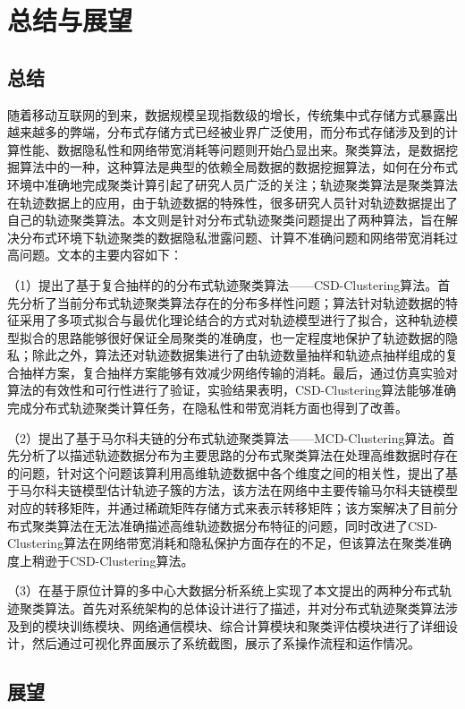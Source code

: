 \chapter{总结与展望}

\section{总结}

随着移动互联网的到来，数据规模呈现指数级的增长，传统集中式存储方式暴露出越来越多的弊端，分布式存储方式已经被业界广泛使用，而分布式存储涉及到的计算性能、数据隐私性和网络带宽消耗等问题则开始凸显出来。聚类算法，是数据挖掘算法中的一种，这种算法是典型的依赖全局数据的数据挖掘算法，如何在分布式环境中准确地完成聚类计算引起了研究人员广泛的关注；轨迹聚类算法是聚类算法在轨迹数据上的应用，由于轨迹数据的特殊性，很多研究人员针对轨迹数据提出了自己的轨迹聚类算法。本文则是针对分布式轨迹聚类问题提出了两种算法，旨在解决分布式环境下轨迹聚类的数据隐私泄露问题、计算不准确问题和网络带宽消耗过高问题。文本的主要内容如下：

（1）提出了基于复合抽样的的分布式轨迹聚类算法——CSD-Clustering算法。首先分析了当前分布式轨迹聚类算法存在的分布多样性问题；算法针对轨迹数据的特征采用了多项式拟合与最优化理论结合的方式对轨迹模型进行了拟合，这种轨迹模型拟合的思路能够很好保证全局聚类的准确度，也一定程度地保护了轨迹数据的隐私；除此之外，算法还对轨迹数据集进行了由轨迹数量抽样和轨迹点抽样组成的复合抽样方案，复合抽样方案能够有效减少网络传输的消耗。最后，通过仿真实验对算法的有效性和可行性进行了验证，实验结果表明，CSD-Clustering算法能够准确完成分布式轨迹聚类计算任务，在隐私性和带宽消耗方面也得到了改善。

（2）提出了基于马尔科夫链的分布式轨迹聚类算法——MCD-Clustering算法。首先分析了以描述轨迹数据分布为主要思路的分布式聚类算法在处理高维数据时存在的问题，针对这个问题该算利用高维轨迹数据中各个维度之间的相关性，提出了基于马尔科夫链模型估计轨迹子簇的方法，该方法在网络中主要传输马尔科夫链模型对应的转移矩阵，并通过稀疏矩阵存储方式来表示转移矩阵；该方案解决了目前分布式聚类算法在无法准确描述高维轨迹数据分布特征的问题，同时改进了CSD-Clustering算法在网络带宽消耗和隐私保护方面存在的不足，但该算法在聚类准确度上稍逊于CSD-Clustering算法。

（3）在基于原位计算的多中心大数据分析系统上实现了本文提出的两种分布式轨迹聚类算法。首先对系统架构的总体设计进行了描述，并对分布式轨迹聚类算法涉及到的模块训练模块、网络通信模块、综合计算模块和聚类评估模块进行了详细设计，然后通过可视化界面展示了系统截图，展示了系操作流程和运作情况。

\section{展望}

